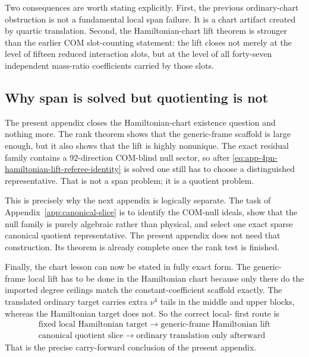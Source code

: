 \documentclass[11pt]{article}
\begin{document}
Two consequences are worth stating explicitly.
First, the previous ordinary-chart obstruction is not a fundamental local span
failure.  It is a chart artifact created by quartic translation.  Second, the
Hamiltonian-chart lift theorem is stronger than the earlier COM slot-counting
statement: the lift closes not merely at the level of fifteen reduced
interaction slots, but at the level of all forty-seven independent mass-ratio
coefficients carried by those slots.

\subsection{Why span is solved but quotienting is not}
\label{app:hamiltonian-lift-transition}

The present appendix closes the Hamiltonian-chart existence question and nothing
more.  The rank theorem shows that the generic-frame scaffold is large enough,
but it also shows that the lift is highly nonunique.  The exact residual family
contains a $92$-direction COM-blind null sector, so after
\eqref{eq:app-4pn-hamiltonian-lift-referee-identity} is solved one still has to
choose a distinguished representative.  That is not a span problem; it is a
quotient problem.

This is precisely why the next appendix is logically separate.  The task of
Appendix~\ref{app:canonical-slice} is to identify the COM-null ideals, show
that the null family is purely algebraic rather than physical, and select one
exact sparse canonical quotient representative.  The present appendix does not
need that construction.  Its theorem is already complete once the rank test is
finished.

Finally, the chart lesson can now be stated in fully exact form.  The generic-
frame local lift has to be done in the Hamiltonian chart because only there do
the imported degree ceilings match the constant-coefficient scaffold exactly.
The translated ordinary target carries extra $\nu^4$ tails in the middle and
upper blocks, whereas the Hamiltonian target does not.  So the correct local-
first route is
\begin{equation}
\boxed{\begin{gathered}
\text{fixed local Hamiltonian target}
\;\longrightarrow\;
\text{generic-frame Hamiltonian lift}
\\
\text{canonical quotient slice}
\;\longrightarrow\;
\text{ordinary translation only afterward}
\end{gathered}}
\label{eq:app-4pn-hamiltonian-lift-program}
\end{equation}
That is the precise carry-forward conclusion of the present appendix.
\end{document}
